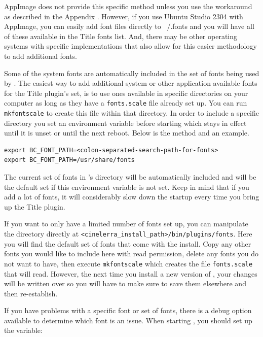 AppImage does not provide this specific method unless you use the workaround as described in the Appendix .
However, if you use Ubuntu Studio 2304 with AppImage, you can easily add font files directly to ~/.fonts and you will have all of these available in the Title fonts list. And, there may be other operating systems with specific implementations that also allow for this easier methodology to add additional fonts.

Some of the system fonts are automatically included in the set of fonts being used by \CGG{}. The easiest way to add additional system or other application available fonts for the Title plugin's set, is to use ones available in specific directories on your computer as long as they have a \texttt{fonts.scale} file already set up. You can run \texttt{mkfontscale} to create this file within that directory. In order to include a specific directory you set an environment variable before starting \CGG{} which stays in effect until it is unset or until the next reboot. Below is the method and an example.

\vspace{1ex}
\begin{lstlisting}[style=sh]
export BC_FONT_PATH=<colon-separated-search-path-for-fonts>
export BC_FONT_PATH=/usr/share/fonts
\end{lstlisting}

The current set of fonts in \CGG{}'s directory will be automatically included and will be the default set if this environment variable is not set. Keep in mind that if you add a lot of fonts, it will considerably slow down the startup every time you bring up the Title plugin.

If you want to only have a limited number of fonts set up, you can manipulate the \CGG{} directory directly at \texttt{<cinelerra\_install\_path>/bin/plug\-ins/fonts}.
Here you will find the default set of fonts that come with the install. Copy any other fonts you would like to include here with read permission, delete any fonts you do not want to have, then execute \texttt{mkfontscale} which creates the file \texttt{fonts.scale} that \CGG{} will read. However, the next time you install a new version of \CGG{}, your changes will be written over so you will have to make sure to save them elsewhere and then re-establish.

If you have problems with a specific font or set of fonts, there is a debug option available to determine which font is an issue. When starting \CGG{}, you should set up the variable:

